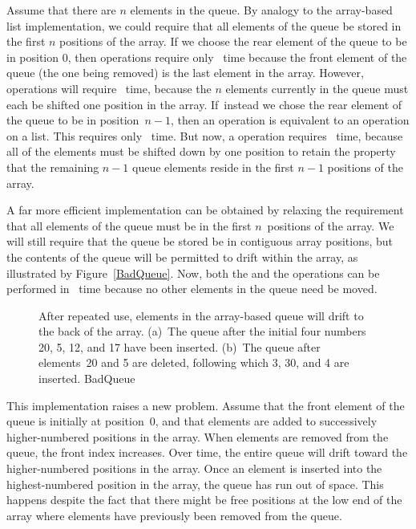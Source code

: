Assume that there are $n$ elements in the queue.
By analogy to the array-based list implementation, we could require
that all elements of the queue be stored in the first $n$ positions of
the array.
If we choose the rear element of the queue to be in position 0,
then  operations require only
\Thetaone\ time because the front element of the queue (the one being
removed) is the last element in the array.
However,  operations will require
\Thetan\ time, because the $n$ elements currently in the queue must
each be shifted one position in the array.
If~instead we chose the rear element of the queue to be in
position~$n-1$, then an  operation is equivalent to an
 operation on a list.
This requires only \Thetaone\ time.
But now, a  operation requires \Thetan\ time, because
all of the elements must be shifted down by one position to retain
the property that the remaining $n-1$ queue elements reside in the
first $n-1$ positions of the array.

A far more efficient implementation can be obtained by relaxing the
requirement that all elements of the queue must be in the first
$n$~positions of the array.
We will still require that the queue be stored be in contiguous array
positions, but the contents of the queue will be permitted to drift
within the array, as illustrated by Figure~\ref{BadQueue}.
Now, both the  and the  operations can be
performed in \Thetaone\ time because no other elements in the queue
need be moved.

\begin{figure}
\vspace{-\bigskipamount}

{After repeated use, elements in the array-based queue will drift to
the back of the array.
(a)~The queue after the initial four numbers 20, 5, 12, and 17 have been
inserted.
(b)~The queue after elements~20 and 5 are deleted, following which 3,
30, and 4 are inserted.}
{BadQueue}
\medskip
\end{figure}

This implementation raises a new problem.
Assume that the front element of the queue is initially at
position~0, and that elements are added to successively
higher-numbered positions in the array.
When elements are removed from the queue, the front index increases.
Over time, the entire queue will drift toward the
higher-numbered positions in the array.
Once an element is inserted into the highest-numbered position
in the array, the queue has run out of space.
This happens despite the fact that there might be free positions at
the low end of the array where elements have previously been removed
from the queue.

